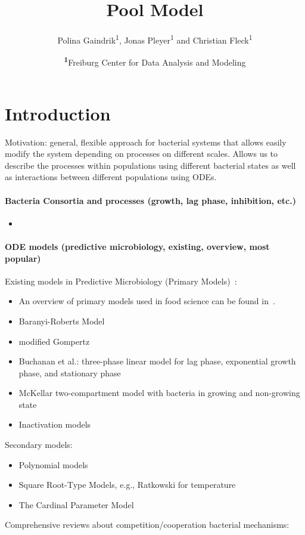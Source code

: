\documentclass[10pt,A4paper]{article}
\title{Pool Model}
\author{
    Polina Gaindrik\textsuperscript{1},
    Jonas Pleyer\textsuperscript{1}
    and Christian Fleck\textsuperscript{1}
}
\date{
    \footnotesize
    \textsuperscript{\textbf{1}}Freiburg Center for Data Analysis and Modeling
}
\numberwithin{equation}{section}
\begin{document}
\maketitle

\tableofcontents

\twocolumn

\newpage
%
%
%
%
\section{Introduction}
Motivation: general, flexible approach for bacterial systems that allows easily modify the system depending on processes on different scales.
Allows us to describe the processes within populations using different bacterial states as well as interactions between different populations using ODEs.

\paragraph{Bacteria Consortia and processes (growth, lag phase, inhibition, etc.)}
\begin{itemize}
    \item 
\end{itemize}

\noindent
\paragraph{ODE models (predictive microbiology, existing, overview, most popular)}
Existing models in Predictive Microbiology (Primary Models)~\cite{perez-rodriguez_predictive_2012}:
\begin{itemize}
    \item An overview of primary models used in food science can be found in~\cite{van_boekel_kinetic_2008}.
    \item Baranyi-Roberts Model~\cite{baranyi_modeling_1993, baranyi_dynamic_1994}
    \item modified Gompertz
    \item Buchanan et al.: three-phase linear model for lag phase, exponential growth phase, and stationary phase~\cite{buchanan_when_1997}
    \item McKellar two-compartment model with bacteria in growing and non-growing state~\cite{mckellar_heterogeneous_1997}
    \item Inactivation models
\end{itemize}
%
Secondary models:
\begin{itemize}
    \item Polynomial models 
    \item Square Root-Type Models, e.g., Ratkowski for temperature~\cite{ratkowsky_relationship_1982}
    \item The Cardinal Parameter Model~\cite{zwietering_decision_1992}
\end{itemize}
%
%
Comprehensive reviews about competition/cooperation bacterial mechanisms: \cite{ghoul_ecology_2016, stubbendieck_bacterial_2016, hibbing_bacterial_2010, west_social_2007}\\
\end{document}
